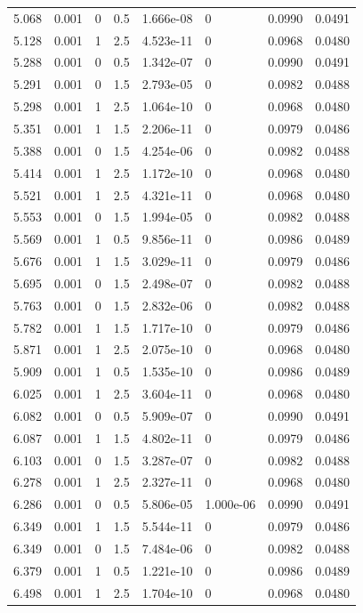 \documentclass[preview]{standalone}
\begin{document}
{{{\begin{tabular}{L{1.2cm}C{1.2cm} C{0.3cm}C{0.5cm} C{1.4cm}C{1.4cm} C{1.4cm}C{1.4cm}}
  5.068  &  0.001  & 0     & 0.5 &  1.666e-08  & 0  & 0.0990 &  0.0491   \\ 
  5.128  &  0.001  & 1     & 2.5 &  4.523e-11  & 0  & 0.0968 &  0.0480   \\ 
  5.288  &  0.001  & 0     & 0.5 &  1.342e-07  & 0  & 0.0990 &  0.0491   \\ 
  5.291  &  0.001  & 0     & 1.5 &  2.793e-05  & 0  & 0.0982 &  0.0488   \\ 
  5.298  &  0.001  & 1     & 2.5 &  1.064e-10  & 0  & 0.0968 &  0.0480   \\ 
  5.351  &  0.001  & 1     & 1.5 &  2.206e-11  & 0  & 0.0979 &  0.0486   \\ 
  5.388  &  0.001  & 0     & 1.5 &  4.254e-06  & 0  & 0.0982 &  0.0488   \\ 
  5.414  &  0.001  & 1     & 2.5 &  1.172e-10  & 0  & 0.0968 &  0.0480   \\ 
  5.521  &  0.001  & 1     & 2.5 &  4.321e-11  & 0  & 0.0968 &  0.0480   \\ 
  5.553  &  0.001  & 0     & 1.5 &  1.994e-05  & 0  & 0.0982 &  0.0488   \\ 
  5.569  &  0.001  & 1     & 0.5 &  9.856e-11  & 0  & 0.0986 &  0.0489   \\ 
  5.676  &  0.001  & 1     & 1.5 &  3.029e-11  & 0  & 0.0979 &  0.0486   \\ 
  5.695  &  0.001  & 0     & 1.5 &  2.498e-07  & 0  & 0.0982 &  0.0488   \\ 
  5.763  &  0.001  & 0     & 1.5 &  2.832e-06  & 0  & 0.0982 &  0.0488   \\ 
  5.782  &  0.001  & 1     & 1.5 &  1.717e-10  & 0  & 0.0979 &  0.0486   \\ 
  5.871  &  0.001  & 1     & 2.5 &  2.075e-10  & 0  & 0.0968 &  0.0480   \\ 
  5.909  &  0.001  & 1     & 0.5 &  1.535e-10  & 0  & 0.0986 &  0.0489   \\ 
  6.025  &  0.001  & 1     & 2.5 &  3.604e-11  & 0  & 0.0968 &  0.0480   \\ 
  6.082  &  0.001  & 0     & 0.5 &  5.909e-07  & 0  & 0.0990 &  0.0491   \\ 
  6.087  &  0.001  & 1     & 1.5 &  4.802e-11  & 0  & 0.0979 &  0.0486   \\ 
  6.103  &  0.001  & 0     & 1.5 &  3.287e-07  & 0  & 0.0982 &  0.0488   \\ 
  6.278  &  0.001  & 1     & 2.5 &  2.327e-11  & 0  & 0.0968 &  0.0480   \\ 
  6.286  &  0.001  & 0     & 0.5 &  5.806e-05  & 1.000e-06  & 0.0990 &  0.0491   \\ 
  6.349  &  0.001  & 1     & 1.5 &  5.544e-11  & 0  & 0.0979 &  0.0486   \\ 
  6.349  &  0.001  & 0     & 1.5 &  7.484e-06  & 0  & 0.0982 &  0.0488   \\ 
  6.379  &  0.001  & 1     & 0.5 &  1.221e-10  & 0  & 0.0986 &  0.0489   \\ 
  6.498  &  0.001  & 1     & 2.5 &  1.704e-10  & 0  & 0.0968 &  0.0480   \\ 
\hline 
\end{tabular} 

}}}
\end{document}
